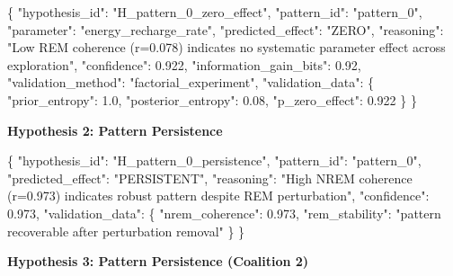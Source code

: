 \documentclass[
]{article}
\newenvironment{Shaded}{}{}
\newcommand{\DataTypeTok}[1]{\textcolor[rgb]{0.56,0.13,0.00}{#1}}
\newcommand{\FloatTok}[1]{\textcolor[rgb]{0.25,0.63,0.44}{#1}}
\newcommand{\FunctionTok}[1]{\textcolor[rgb]{0.02,0.16,0.49}{#1}}
\newcommand{\StringTok}[1]{\textcolor[rgb]{0.25,0.44,0.63}{#1}}
\begin{document}
\begin{Shaded}
\begin{Highlighting}[]
\FunctionTok{\{}
  \DataTypeTok{"hypothesis\_id"}\FunctionTok{:} \StringTok{"H\_pattern\_0\_zero\_effect"}\FunctionTok{,}
  \DataTypeTok{"pattern\_id"}\FunctionTok{:} \StringTok{"pattern\_0"}\FunctionTok{,}
  \DataTypeTok{"parameter"}\FunctionTok{:} \StringTok{"energy\_recharge\_rate"}\FunctionTok{,}
  \DataTypeTok{"predicted\_effect"}\FunctionTok{:} \StringTok{"ZERO"}\FunctionTok{,}
  \DataTypeTok{"reasoning"}\FunctionTok{:} \StringTok{"Low REM coherence (r=0.078) indicates no systematic parameter effect across exploration"}\FunctionTok{,}
  \DataTypeTok{"confidence"}\FunctionTok{:} \FloatTok{0.922}\FunctionTok{,}
  \DataTypeTok{"information\_gain\_bits"}\FunctionTok{:} \FloatTok{0.92}\FunctionTok{,}
  \DataTypeTok{"validation\_method"}\FunctionTok{:} \StringTok{"factorial\_experiment"}\FunctionTok{,}
  \DataTypeTok{"validation\_data"}\FunctionTok{:} \FunctionTok{\{}
    \DataTypeTok{"prior\_entropy"}\FunctionTok{:} \FloatTok{1.0}\FunctionTok{,}
    \DataTypeTok{"posterior\_entropy"}\FunctionTok{:} \FloatTok{0.08}\FunctionTok{,}
    \DataTypeTok{"p\_zero\_effect"}\FunctionTok{:} \FloatTok{0.922}
  \FunctionTok{\}}
\FunctionTok{\}}
\end{Highlighting}
\end{Shaded}

\textbf{Hypothesis 2: Pattern Persistence}

\begin{Shaded}
\begin{Highlighting}[]
\FunctionTok{\{}
  \DataTypeTok{"hypothesis\_id"}\FunctionTok{:} \StringTok{"H\_pattern\_0\_persistence"}\FunctionTok{,}
  \DataTypeTok{"pattern\_id"}\FunctionTok{:} \StringTok{"pattern\_0"}\FunctionTok{,}
  \DataTypeTok{"predicted\_effect"}\FunctionTok{:} \StringTok{"PERSISTENT"}\FunctionTok{,}
  \DataTypeTok{"reasoning"}\FunctionTok{:} \StringTok{"High NREM coherence (r=0.973) indicates robust pattern despite REM perturbation"}\FunctionTok{,}
  \DataTypeTok{"confidence"}\FunctionTok{:} \FloatTok{0.973}\FunctionTok{,}
  \DataTypeTok{"validation\_data"}\FunctionTok{:} \FunctionTok{\{}
    \DataTypeTok{"nrem\_coherence"}\FunctionTok{:} \FloatTok{0.973}\FunctionTok{,}
    \DataTypeTok{"rem\_stability"}\FunctionTok{:} \StringTok{"pattern recoverable after perturbation removal"}
  \FunctionTok{\}}
\FunctionTok{\}}
\end{Highlighting}
\end{Shaded}

\textbf{Hypothesis 3: Pattern Persistence (Coalition 2)}
\end{document}
